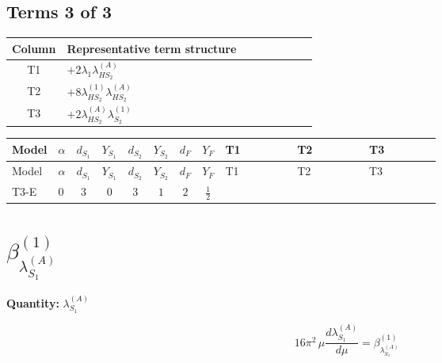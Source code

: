 \documentclass[8pt]{article}
\begin{document}
\begin{landscape}
\subsection*{Terms 3 of 3}
\begin{center}
\begin{tabular}{@{}c >{\raggedright\arraybackslash}p{0.82\linewidth}@{}}
\toprule
Column & Representative term structure \\
\midrule
T1 & \(\displaystyle +2 {\lambda_1} {\lambda_{HS_2}^{(A)}}\) \\
\midrule
T2 & \(\displaystyle +8 {\lambda_{HS_2}^{(1)}} {\lambda_{HS_2}^{(A)}}\) \\
\midrule
T3 & \(\displaystyle +2 {\lambda_{HS_2}^{(A)}} {\lambda_{S_2}^{(1)}}\) \\
\midrule
\bottomrule
\end{tabular}
\end{center}
\smallskip
\tiny
\begin{longtable}{@{}llcccccc >{\raggedright\arraybackslash}p{0.21\linewidth} >{\raggedright\arraybackslash}p{0.21\linewidth} >{\raggedright\arraybackslash}p{0.21\linewidth}@{}}
\toprule
Model & $\alpha$ & $d_{S_1}$ & $Y_{S_1}$ & $d_{S_2}$ & $Y_{S_2}$ & $d_F$ & $Y_F$ & T1 & T2 & T3 \\
\midrule
\endfirsthead
\toprule
Model & $\alpha$ & $d_{S_1}$ & $Y_{S_1}$ & $d_{S_2}$ & $Y_{S_2}$ & $d_F$ & $Y_F$ & T1 & T2 & T3 \\
\midrule
\endhead
T3-E & $0$ & $3$ & $0$ & $3$ & $1$ & $2$ & $\frac{1}{2}$ & \scriptsize\adjustbox{max width=\linewidth}{$\begin{gathered} +2 {\lambda_1} {\lambda_{HS_2}^{(A)}}\end{gathered}$} & \scriptsize\adjustbox{max width=\linewidth}{$\begin{gathered} +8 {\lambda_{HS_2}^{(1)}} {\lambda_{HS_2}^{(A)}}\end{gathered}$} & \scriptsize\adjustbox{max width=\linewidth}{$\begin{gathered} +2 {\lambda_{HS_2}^{(A)}} {\lambda_{S_2}^{(1)}}\end{gathered}$} \\
\midrule
\bottomrule
\end{longtable}
\clearpage
\section*{$\beta_{\lambda_{S_1}^{(A)}}^{(1)}$}
\noindent\textbf{Quantity: }$\lambda_{S_1}^{(A)}$\par\smallskip
\[16\pi^2\,\mu\frac{d \lambda_{S_1}^{(A)}}{d\mu}=\beta_{\lambda_{S_1}^{(A)}}^{(1)}\]

\end{landscape}
\end{document}
